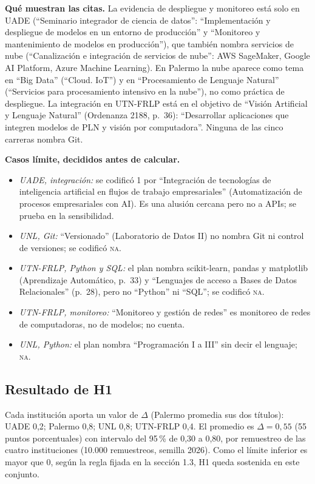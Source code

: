 \documentclass[11pt,a4paper]{article}
\newcommand{\NA}{\textsc{na}}
\begin{document}
\textbf{Qué muestran las citas.} La evidencia de despliegue y monitoreo está solo en UADE (``Seminario integrador de ciencia de datos'': ``Implementación y despliegue de modelos en un entorno de producción'' y ``Monitoreo y mantenimiento de modelos en producción''), que también nombra servicios de nube (``Canalización e integración de servicios de nube'': AWS SageMaker, Google AI Platform, Azure Machine Learning). En Palermo la nube aparece como tema en ``Big Data'' (``Cloud. IoT'') y en ``Procesamiento de Lenguaje Natural'' (``Servicios para procesamiento intensivo en la nube''), no como práctica de despliegue. La integración en UTN-FRLP está en el objetivo de ``Visión Artificial y Lenguaje Natural'' (Ordenanza 2188, p.~36): ``Desarrollar aplicaciones que integren modelos de PLN y visión por computadora''. Ninguna de las cinco carreras nombra Git.

\textbf{Casos límite, decididos antes de calcular.}
\begin{itemize}
\item \emph{UADE, integración:} se codificó 1 por ``Integración de tecnologías de inteligencia artificial en flujos de trabajo empresariales'' (Automatización de procesos empresariales con AI). Es una alusión cercana pero no a APIs; se prueba en la sensibilidad.
\item \emph{UNL, Git:} ``Versionado'' (Laboratorio de Datos II) no nombra Git ni control de versiones; se codificó \NA{}.
\item \emph{UTN-FRLP, Python y SQL:} el plan nombra scikit-learn, pandas y matplotlib (Aprendizaje Automático, p.~33) y ``Lenguajes de acceso a Bases de Datos Relacionales'' (p.~28), pero no ``Python'' ni ``SQL''; se codificó \NA{}.
\item \emph{UTN-FRLP, monitoreo:} ``Monitoreo y gestión de redes'' es monitoreo de redes de computadoras, no de modelos; no cuenta.
\item \emph{UNL, Python:} el plan nombra ``Programación I a III'' sin decir el lenguaje; \NA{}.
\end{itemize}

\subsection{Resultado de H1}
Cada institución aporta un valor de $\Delta$ (Palermo promedia sus dos títulos): UADE 0,2; Palermo 0,8; UNL 0,8; UTN-FRLP 0,4. El promedio es $\Delta = 0{,}55$ (55 puntos porcentuales) con intervalo del 95\,\% de 0,30 a 0,80, por remuestreo de las cuatro instituciones (10.000 remuestreos, semilla 2026). Como el límite inferior es mayor que 0, según la regla fijada en la sección 1.3, H1 queda sostenida en este conjunto.
\end{document}
